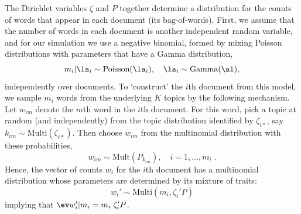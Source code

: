 \documentclass[12pt]{article}
\begin{document}
 
The Dirichlet variables $\zeta$ and $P$ together determine a distribution for the counts of words that appear in each document (its bag-of-words).  First, we assume that the number of words in each document is another independent random variable, and for our simulation we use a negative binomial, formed by mixing Poisson distributions with parameters that have a Gamma distribution,
\begin{equation}
  m_i|\la_i \sim \mbox{Poisson}(\la_i), \quad \la_i \sim \mbox{Gamma}(\al),
\end{equation}
independently over documents.  To `construct' the $i$th document from this model, we sample $m_i$ words from the underlying $K$ topics by the following mechanism.  Let $w_{im}$ denote the $m$th word in the $i$th document.  For this word, pick a topic at random (and independently) from the topic distribution identified by $\zeta_{i*}$, say $k_{im} \sim \mbox{Multi}(\zeta_{i*})$.  Then choose $w_{im}$ from the multinomial distribution with these probabilities, 
\begin{equation}
  w_{im} \sim \mbox{Mult}(P_{k_{im}}), \quad i = 1,\ldots,m_i \;.
  \label{eq:wim}
\end{equation}
Hence, the vector of counts $w_i$ for the $i$th document has a multinomial distribution whose parameters are determined by its mixture of traits:
 \begin{equation}
   w_i' \sim \mbox{Multi}(m_i, \zeta_i' P)   
 \label{eq:di}
 \end{equation}
 implying that $\ev w_i' | m_i = m_i \; \zeta_i'P$.  
 
 
\end{document}
